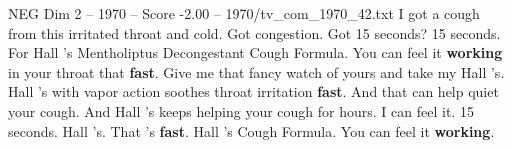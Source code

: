 \begin{textsample}{NEG Dim 2 – 1970 – Score -2.00 – 1970/tv\_com\_1970\_42.txt}  \label{ex:f2_neg_042}
I got a cough from this irritated throat and cold.
Got congestion.
Got 15 seconds? 15 seconds.
For Hall 's Mentholiptus Decongestant Cough Formula.
You can feel it \textbf{working} in your throat that \textbf{fast}.
Give me that fancy watch of yours and take my Hall 's.
Hall 's with vapor action soothes throat irritation \textbf{fast}.
And that can help quiet your cough.
And Hall 's keeps helping your cough for hours.
I can feel it. 15 seconds.
Hall 's.
That 's \textbf{fast}.
Hall 's Cough Formula.
You can feel it \textbf{working}.

\end{textsample}
